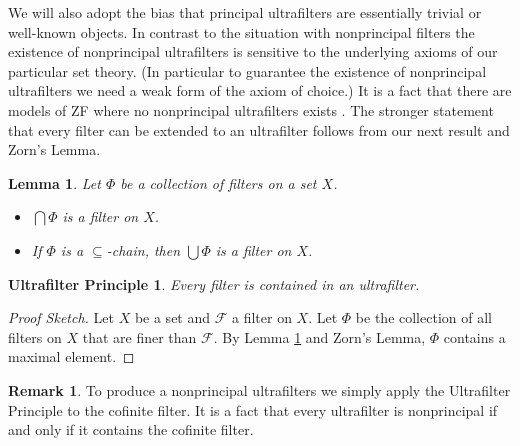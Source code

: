 \documentclass[12pt]{article}
\theoremstyle{plain}
\newtheorem{lem}[thm]{Lemma}
\newtheorem{up}[thm]{Ultrafilter Principle}
\theoremstyle{definition}
\newtheorem{rmk}[thm]{Remark}
\newcommand{\calF}{\mathcal{F}}
\begin{document}
We will also adopt the bias that principal ultrafilters are essentially trivial or well-known objects.
In contrast to the situation with nonprincipal filters the existence of nonprincipal ultrafilters is sensitive to the underlying axioms of our particular set theory.
(In particular to guarantee the existence of nonprincipal ultrafilters we need a weak form of the axiom of choice.)
It is a fact that there are models of ZF where no nonprincipal ultrafilters exists \cite{Blass:1977fk}.
The stronger statement that every filter can be extended to an ultrafilter follows from our next result and Zorn's Lemma.%



\begin{lem}
  \label{lem:chainFlt}
  Let $\Phi$ be a collection of filters on a set $X$.
  \begin{itemize}
    \item[(a)] $\bigcap\Phi$ is a filter on $X$.

    \item[(b)] If $\Phi$ is a \mbox{$\subseteq$-chain}, then $\bigcup\Phi$ is a filter on $X$.
  \end{itemize}
\end{lem}

\begin{up}
  Every filter is contained in an ultrafilter.
\end{up}
\begin{proof}[Proof Sketch]
  Let $X$ be a set and $\calF$ a filter on $X$.
  Let $\Phi$ be the collection of all filters on $X$ that are finer than $\calF$.
  By Lemma \ref{lem:chainFlt} and Zorn's Lemma, $\Phi$ contains a maximal element.
\end{proof}
\begin{rmk}
  To produce a nonprincipal ultrafilters we simply apply the Ultrafilter Principle to the cofinite filter.
  It is a fact that every ultrafilter is nonprincipal if and only if it contains the cofinite filter.
\end{rmk}
\end{document}
